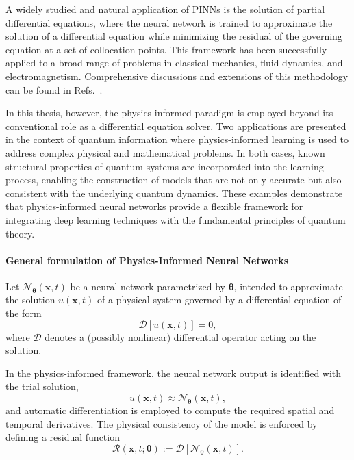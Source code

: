 A widely studied and natural application of PINNs is the solution of partial differential equations, where the neural network is trained to approximate the solution of a differential equation while minimizing the residual of the governing equation at a set of collocation points. This framework has been successfully applied to a broad range of problems in classical mechanics, fluid dynamics, and electromagnetism. Comprehensive discussions and extensions of this methodology can be found in Refs.~\cite{Edward2023, Son2023, Ren2025, Prakash2025, Raissi2019, Lu2021, Neuer2021}.

In this thesis, however, the physics-informed paradigm is employed beyond its conventional role as a differential equation solver. Two applications are presented in the context of quantum information where physics-informed learning is used to address complex physical and mathematical problems. In both cases, known structural properties of quantum systems are incorporated into the learning process, enabling the construction of models that are not only accurate but also consistent with the underlying quantum dynamics. These examples demonstrate that physics-informed neural networks provide a flexible framework for integrating deep learning techniques with the fundamental principles of quantum theory.

\paragraph{General formulation of Physics-Informed Neural Networks}
Let $\mathcal{N}_{\boldsymbol{\theta}}(\mathbf{x}, t)$ be a neural network parametrized by $\boldsymbol{\theta}$, intended to approximate the solution $u(\mathbf{x}, t)$ of a physical system governed by a differential equation of the form
\begin{equation}
    \mathcal{D}[u(\mathbf{x}, t)] = 0,
\end{equation}
where $\mathcal{D}$ denotes a (possibly nonlinear) differential operator acting on the solution.

In the physics-informed framework, the neural network output is identified with the trial solution,
\begin{equation}
    u(\mathbf{x}, t) \approx \mathcal{N}_{\boldsymbol{\theta}}(\mathbf{x}, t),
\end{equation}
and automatic differentiation is employed to compute the required spatial and temporal derivatives. The physical consistency of the model is enforced by defining a residual function
\begin{equation}
    \mathcal{R}(\mathbf{x}, t; \boldsymbol{\theta}) := \mathcal{D}[\mathcal{N}_{\boldsymbol{\theta}}(\mathbf{x}, t)].
\end{equation}

